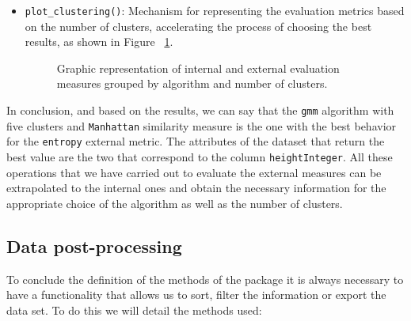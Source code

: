 \begin{itemize}
\item \texttt{plot\_clustering()}: Mechanism for representing the evaluation metrics based on the number of clusters, accelerating the process of choosing the best results, as shown in Figure ~\ref{fig:clustering}.

\begin{figure}[htbp]
  \centering
    \qquad
    \caption{Graphic representation of internal and external evaluation measures grouped by algorithm and number of clusters.}%
    \label{fig:clustering}%
\end{figure}

\end{itemize}
In conclusion, and based on the results, we can say that the \texttt{gmm} algorithm with five clusters and \texttt{Manhattan} similarity measure is the one with the best behavior for the \texttt{entropy} external metric. The attributes of the dataset that return the best value are the two that correspond to the column \texttt{heightInteger}.
All these operations that we have carried out to evaluate the external measures can be extrapolated to the internal ones and obtain the necessary information for the appropriate choice of the algorithm as well as the number of clusters.\\

\subsection {Data post-processing}

To conclude the definition of the methods of the package it is always necessary to have a functionality that allows us to sort, filter the information or export the data set. To do this we will detail the methods used:

